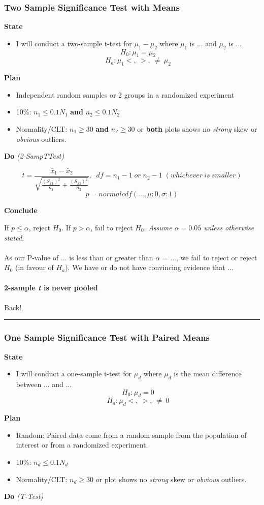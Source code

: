 \documentclass[main]{subfiles}
\begin{document}
\subsubsection{Two Sample Significance Test with Means}
\textbf{State}
\begin{itemize}
    \item I will conduct a two-sample t-test for $\mu_1 - \mu_2$ where $\mu_1$ is ... and $\mu_2$ is ...
    \[H_0 : \mu_1 = \mu_2\]
    \[H_a : \mu_1 <,\:>,\:\neq\ \mu_2\]
\end{itemize}
\textbf{Plan}
\begin{itemize}
    \item Independent random samples or 2 groups in a randomized experiment
    \item 10\%: $n_1 \leq 0.1N_1$ \textbf{and} $n_2 \leq 0.1N_2$
    \item Normality/CLT: $n_1 \geq 30$ \textbf{and} $n_2 \geq 30$ or \textbf{both} plots shows no \textit{strong} skew or \textit{obvious} outliers.
\end{itemize}
\textbf{Do} \textit{(2-SampTTest)}

\[t = \frac{\bar{x}_1 - \bar{x}_2}{\sqrt{\frac{(S_{x1})^2}{n_1} + \frac{(S_{x2})^2}{n_2}}},\;\;df = n_1 - 1 \;or\; n_2 - 1 \;(whichever\:is\:smaller)\]
\[p = normalcdf(..., \mu: 0, \sigma: 1)\]

\noindent\textbf{Conclude}

If $p \leq \alpha$, reject $H_0$. If $p > \alpha$, fail to reject $H_0$.
\textit{Assume $\alpha = 0.05$ unless otherwise stated.}
\\~\\
As our P-value of ... is less than or greater than $\alpha$ = ..., we fail to reject or reject $H_0$ (in favour of $H_a$). 
We have or do not have convincing evidence that ...
\\~\\
\noindent\textbf{2-sample \textit{t} is never pooled}
\\~\\
\hyperlink{toc}{Back!}
\newline\hrule

\subsubsection{One Sample Significance Test with Paired Means}
\textbf{State}
\begin{itemize}
    \item I will conduct a one-sample t-test for $\mu_d$ where $\mu_d$ is the mean difference between ... and ...
    \[H_0 : \mu_d = 0\]
    \[H_a : \mu_d <,\:>,\:\neq\ 0\]
\end{itemize}
\textbf{Plan}
\begin{itemize}
    \item Random: Paired data come from a random sample from the population of interest or from a randomized experiment.
    \item 10\%: $n_d \leq 0.1N_d$
    \item Normality/CLT: $n_d \geq 30$ or plot shows no \textit{strong} skew or \textit{obvious} outliers.
\end{itemize}
\textbf{Do} \textit{(T-Test)}
\end{document}
